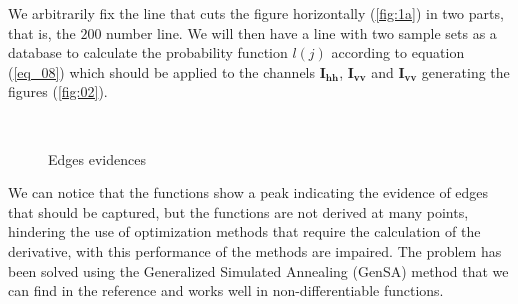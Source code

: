 \documentclass[conference]{IEEEtran}
\begin{document}
    We arbitrarily fix the line that cuts the figure horizontally (\ref{fig:1a}) in two parts, that is, the $200$ number line. We will then have a line with two sample sets as a database to calculate the probability function $l(j)$ according to equation (\ref{eq_08}) which should be applied to the channels $\mathbf{I_\text{hh}}$, $\mathbf{I_\text{vv}}$ and $\mathbf{I_{\text{vv}}}$ generating the figures (\ref{fig:02}).  
\begin{figure}[!ht]
     \hfill
     \\
     \centering
     \caption{Edges evidences}
     \label{fig_02}
   \end{figure}	

We can notice that the functions show a peak indicating the evidence of edges that should be captured, but the functions are not derived at many points, hindering the use of optimization methods that require the calculation of the derivative, with this performance of the methods are impaired. The problem has been solved using the Generalized Simulated Annealing (GenSA) method that we can find in the reference \cite{xgsh} and works well in non-differentiable functions.
    
\end{document}
